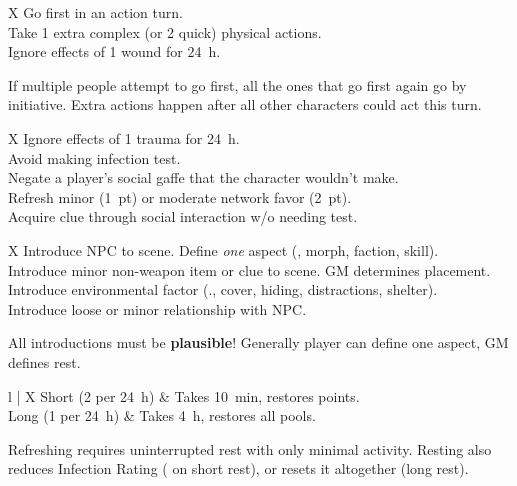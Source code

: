 \bigskip



\begin{eptable}{ X }
   Go first in an action turn.\\
   Take 1 extra complex (or 2 quick) physical actions.\\
   Ignore effects of \num{1} wound for \SI{24}{h}.\\
\end{eptable}

If multiple people attempt to go first, all the ones that go first
again go by initiative. Extra actions happen after all other characters
could act this turn.

\bigskip

\begin{eptable}{ X }
   Ignore effects of \num{1} trauma for \SI{24}{h}.\\
   Avoid making infection test.\\
   Negate a player’s social gaffe that the character wouldn’t make.\\
   Refresh minor (\SI{1}{pt}) or moderate network favor (\SI{2}{pt}).\\
   Acquire clue through social interaction w/o needing test.\\
\end{eptable}




\bigskip



\begin{eptable}{ X }
   Introduce NPC to scene. Define \textit{one} aspect (\eg, morph, faction, skill).\\
   Introduce minor non-weapon item or clue to scene. GM determines placement.\\
   Introduce environmental factor (\eg., cover, hiding, distractions, shelter).\\
   Introduce loose or minor relationship with NPC.\\
\end{eptable}

All introductions must be \textbf{plausible}! Generally player
can define one aspect, GM defines rest.

\bigskip


\begin{eptable}{ l | X }
   Short (2 per \SI{24}{h}) & Takes \SI{10}{min}, restores  points.\\
   Long (1 per \SI{24}{h}) & Takes \SI{4}{h}, restores all pools.\\
\end{eptable}

\begin{itemize}
    \itembox Refreshing requires uninterrupted rest with only minimal activity.
    \itembox Resting also reduces Infection Rating ( on short rest), or resets it altogether (long rest).
\end{itemize}
